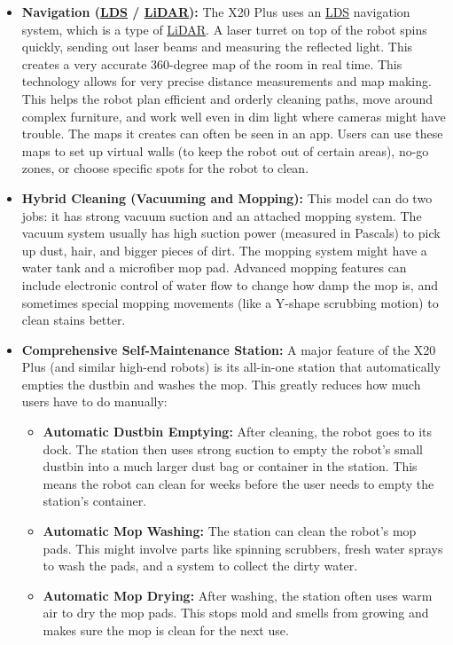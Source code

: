 \begin{itemize}
    \item \textbf{Navigation (\hyperref[term:lds]{LDS} / \hyperref[term:lidar]{LiDAR}):} The X20 Plus uses an \hyperref[term:lds]{LDS} navigation system, which is a type of \hyperref[term:lidar]{LiDAR}. A laser turret on top of the robot spins quickly, sending out laser beams and measuring the reflected light. This creates a very accurate 360-degree map of the room in real time. This technology allows for very precise distance measurements and map making. This helps the robot plan efficient and orderly cleaning paths, move around complex furniture, and work well even in dim light where cameras might have trouble. The maps it creates can often be seen in an app. Users can use these maps to set up virtual walls (to keep the robot out of certain areas), no-go zones, or choose specific spots for the robot to clean.
    \item \textbf{Hybrid Cleaning (Vacuuming and Mopping):} This model can do two jobs: it has strong vacuum suction and an attached mopping system. The vacuum system usually has high suction power (measured in Pascals) to pick up dust, hair, and bigger pieces of dirt. The mopping system might have a water tank and a microfiber mop pad. Advanced mopping features can include electronic control of water flow to change how damp the mop is, and sometimes special mopping movements (like a Y-shape scrubbing motion) to clean stains better.
    \item \textbf{Comprehensive Self-Maintenance Station:} A major feature of the X20 Plus (and similar high-end robots) is its all-in-one station that automatically empties the dustbin and washes the mop. This greatly reduces how much users have to do manually:
        \begin{itemize}
            \item \textbf{Automatic Dustbin Emptying:} After cleaning, the robot goes to its dock. The station then uses strong suction to empty the robot's small dustbin into a much larger dust bag or container in the station. This means the robot can clean for weeks before the user needs to empty the station's container.
            \item \textbf{Automatic Mop Washing:} The station can clean the robot's mop pads. This might involve parts like spinning scrubbers, fresh water sprays to wash the pads, and a system to collect the dirty water.
            \item \textbf{Automatic Mop Drying:} After washing, the station often uses warm air to dry the mop pads. This stops mold and smells from growing and makes sure the mop is clean for the next use.

\end{itemize}
\end{itemize}
